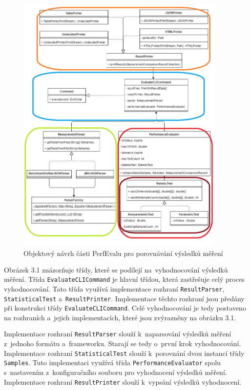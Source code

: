 \begin{figure}[!ht]
    \centering
    \includegraphics[width=0.92\textwidth]{../img/perfeval_evaluate_rect.png}
    \caption{Objektový návrh části PerfEvalu pro porovnávání výsledků měření}
\end{figure}

Obrázek 3.1 znázorňuje třídy, které se podílejí na~vyhodnocování výsledků měření.
Třída \lstinline|EvaluateCLICommand| je hlavní třídou, která zastřešuje celý proces vyhodnocování.
Tato třída využívá implementace rozhraní \lstinline|ResultParser|, \lstinline|StatisticalTest| a~\lstinline|ResultPrinter|.
Implementace těchto rozhraní jsou předány při konstrukci třídy \lstinline|EvaluateCLICommand|.
Celé vyhodnocování je tedy postaveno na rozhraních a~jejich implementacích, které jsou zvýrazněny na obrázku 3.1.

Implementace rozhraní \lstinline|ResultParser| slouží k~naparsování výsledků měření z~jednoho formátu a~frameworku.
Starají se tedy o~první krok vyhodnocování. Implementace rozhraní \lstinline|StatisticalTest| slouží k~porovnání dvou instancí třídy \lstinline|Samples|.
Tuto implementaci využívá třída \lstinline|PerformanceEvaluator| spolu s~nastavením z~konfiguračního souboru
pro vyhodnocení výsledků měření. Implementace rozhraní \lstinline|ResultPrinter| slouží k~vypsání výsledků vyhodnocení.

